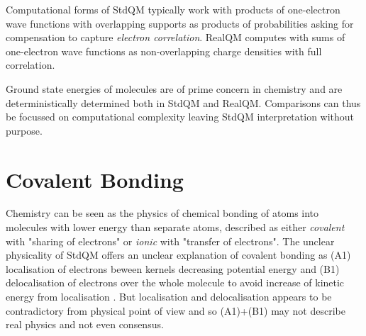 \documentclass[11pt]{article} %
\begin{document}
Computational forms of StdQM typically work with products of one-electron wave functions with overlapping supports as products of probabilities asking for compensation to capture \emph{electron correlation}.  RealQM computes with sums of one-electron wave functions as non-overlapping charge densities with full correlation. 

Ground state energies of molecules are of prime concern in chemistry and are deterministically determined both in StdQM and RealQM.  Comparisons can thus be focussed on computational complexity leaving StdQM interpretation without purpose.









\section{Covalent Bonding}

Chemistry can be seen as the physics of chemical bonding of atoms into molecules with lower energy than separate atoms,  described as either \emph{covalent} with "sharing of electrons" or \emph{ionic} with "transfer of electrons". The unclear physicality of StdQM offers an unclear explanation of covalent bonding as (A1) localisation of electrons beween kernels decreasing potential energy and (B1) delocalisation of electrons over the whole molecule to avoid increase of kinetic energy from localisation \cite{nordholm}.  But localisation and delocalisation appears to be contradictory from physical point of view and so (A1)+(B1) may not describe real physics and not even consensus. 
\end{document}
